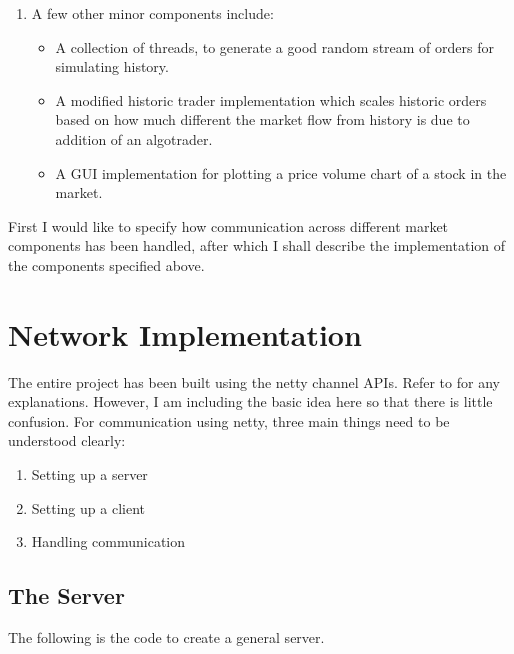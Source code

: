 \documentclass{amsart}
\newenvironment{enumeratenumeric}{\begin{enumerate}[1.] }{\end{enumerate}}
\begin{document}
\begin{enumeratenumeric}
\begin{itemize}
    \item The broker receives feeds from numerous market makers as well as the
    stock market itself. Based on the feeds, it decides which source has the
    best price and forwards the clients order to that particular source. 
  \end{itemize}
  \item A few other minor components include:
  \begin{itemize}
    \item A collection of threads, to generate a good random stream of orders
    for simulating history.
    
    \item A modified historic trader implementation which scales historic
    orders based on how much different the market flow from history is due to
    addition of an algotrader.
    
    \item A GUI implementation for plotting a price volume chart of a stock
    in the market.
  \end{itemize}
\end{enumeratenumeric}
First I would like to specify how communication across different market
components has been handled, after which I shall describe the implementation
of the components specified above.

\section{Network Implementation}

The entire project has been built using the netty channel APIs. Refer to   for
any explanations. However, I am including the basic idea here so that there is
little confusion. For communication using netty, three main things need to be
understood clearly:
\begin{enumerate}
  \item Setting up a server
  
  \item Setting up a client
  
  \item Handling communication
\end{enumerate}

\subsection{The Server}

The following is the code to create a general server.
\end{document}
